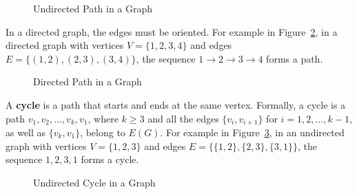 \begin{figure}[h]
\begin{center}
\caption{Undirected Path in a Graph}
\label{fig:path}
\end{center}
\end{figure}

In a directed graph, the edges must be oriented. For example in Figure~\ref{fig:directed_path}, in a directed graph with vertices \( V = \{1, 2, 3, 4\} \) and edges \( E = \{(1, 2), (2, 3), (3, 4)\} \), the sequence \( 1 \to 2 \to 3 \to 4 \) forms a path.

\begin{figure}[h]
\begin{center}
\caption{Directed Path in a Graph}
\label{fig:directed_path}
\end{center}
\end{figure}

A \textbf{cycle} is a path that starts and ends at the same vertex. Formally, a cycle is a path \( v_1, v_2, \dots, v_k, v_1 \), where \( k \geq 3 \) and all the edges \( \{v_i, v_{i+1}\} \) for \( i = 1, 2, \dots, k-1 \), as well as \( \{v_k, v_1\} \), belong to \( E(G) \). For example in Figure~\ref{fig:cycle}, in an undirected graph with vertices \( V = \{1, 2, 3\} \) and edges \( E = \{\{1, 2\}, \{2, 3\}, \{3, 1\}\} \), the sequence \( 1, 2, 3, 1 \) forms a cycle. \cite{yadav2023advanced, cormen2009introduction}

\begin{figure}[h]
\begin{center}
\caption{Undirected Cycle in a Graph}
\label{fig:cycle}
\end{center}
\end{figure}


